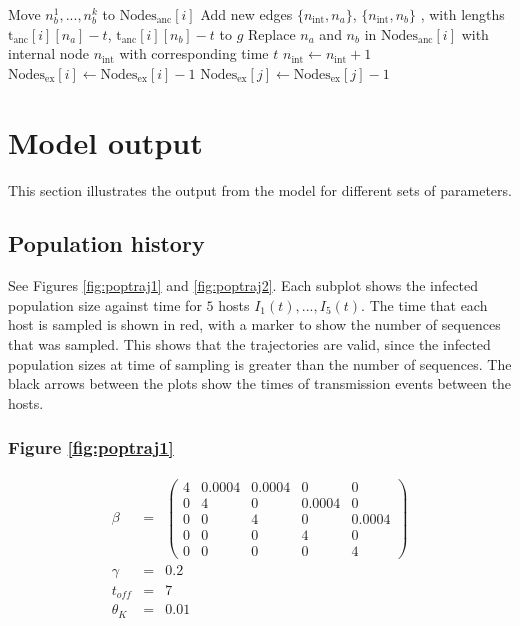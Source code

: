 \documentclass[a4paper,18pt]{report}
\begin{document}
\begin{algorithm}
\begin{algorithmic}
{{	\STATE Move  $n_b^1,...,n_b^k$ to $\textrm{Nodes}_{\textrm{anc}}[i]$ 
	{
	{
		\STATE  Add new edges $\{n_{\textrm{int}}, n_a \}$, $\{n_{\textrm{int}}, n_b \}$ , with lengths $\textrm{t}_{\textrm{anc}}[i][n_a] - t$, $\textrm{t}_{\textrm{anc}}[i][n_b] - t$ to $g$
		\STATE Replace $n_a$ and $n_b$ in $\textrm{Nodes}_{\textrm{anc}}[i]$ with internal node $n_{\textrm{int}}$ with corresponding time $t$
		\STATE $n_{\textrm{int}} \gets n_{\textrm{int}} + 1$
	}
	\ELSE
	{
		{
		\STATE $\textrm{Nodes}_{\textrm{ex}}[i] \gets \textrm{Nodes}_{\textrm{ex}}[i]  - 1 $
		}
		\ELSE
		{
		\STATE $\textrm{Nodes}_{\textrm{ex}}[j] \gets \textrm{Nodes}_{\textrm{ex}}[j]  - 1 $
		}
		\ENDIF
	}
	\ENDIF
	}
	\ENDFOR
}
\ENDIF

}
\ENDFOR
\end{algorithmic}
\end{algorithm}
\section{Model output}
This section illustrates the output from the model for different sets of parameters. 
\subsection{Population history}
See Figures \ref{fig:poptraj1} and \ref{fig:poptraj2}. Each subplot shows the infected population size against time for $5$ hosts $I_1(t),...,I_5(t)$. The time that each host is sampled is shown in red, with a marker to show the number of sequences that was sampled. This shows that the trajectories are valid, since the infected population sizes at time of sampling is greater than the number of sequences. The black arrows between the plots show the times of transmission events between the hosts.
\subsubsection{Figure \ref{fig:poptraj1}}
\begin{eqnarray}
\beta&=& 
\left(
\begin{array}{ccccc}
 4  &	 0.0004 & 0.0004 & 0  & 0\\
 0 & 4  & 0   & 0.0004  & 0\\
 0 &  0  &   4 & 0 & 0.0004\\
 0 &  0 & 0  &4 & 0\\
 0 & 0  &  0 & 0 & 4
 \end{array}
\right)\nonumber\\
\gamma&=&0.2\nonumber\\
t_{off} &=& 7\nonumber\\
\theta_K &=& 0.01
\end{eqnarray}
\end{document}
